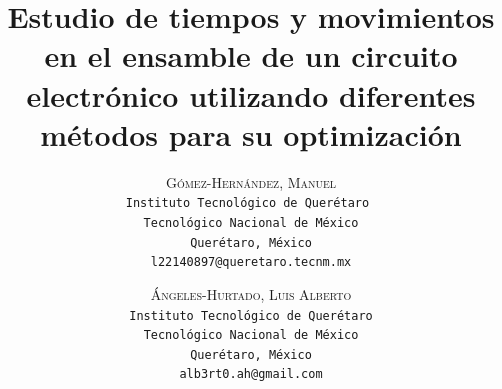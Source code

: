     \lfoot{ \thepage}
    
    \setlength{\droptitle}{-5\baselineskip} %
    \title{\textbf{Estudio de tiempos y movimientos en el ensamble de un circuito electrónico utilizando diferentes métodos para su optimización }} %
    
     \author{ 
     \textsc{Gómez-Hernández, Manuel}\\ 
     \texttt{Instituto Tecnológico de Querétaro } \\ 
     \texttt{Tecnológico Nacional de México} \\ 
     \texttt{Querétaro, México}\\ 
     \texttt{l22140897@queretaro.tecnm.mx} 
     \and 
     \textsc{Ángeles-Hurtado, Luis Alberto}\\ 
     \texttt{ Instituto Tecnológico de Querétaro } \\ 
     \texttt{ Tecnológico Nacional de México } \\ 
     \texttt{Querétaro, México}\\ 
     \texttt{alb3rt0.ah@gmail.com} 
    }
    
